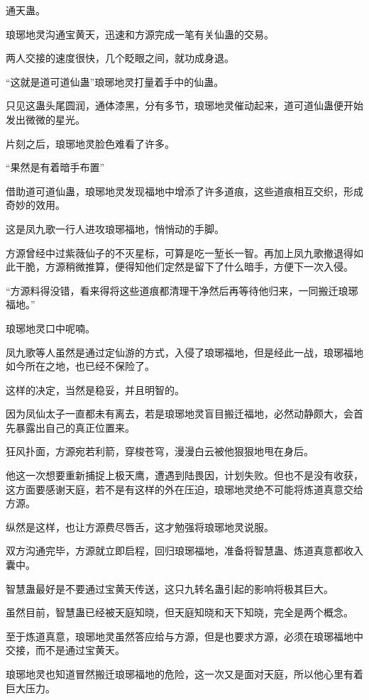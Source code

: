 
\begin{this_body}

通天蛊。

琅琊地灵沟通宝黄天，迅速和方源完成一笔有关仙蛊的交易。

两人交接的速度很快，几个眨眼之间，就功成身退。

“这就是道可道仙蛊”琅琊地灵打量着手中的仙蛊。

只见这蛊头尾圆润，通体漆黑，分有多节，琅琊地灵催动起来，道可道仙蛊便开始发出微微的星光。

片刻之后，琅琊地灵脸色难看了许多。

“果然是有着暗手布置”

借助道可道仙蛊，琅琊地灵发现福地中增添了许多道痕，这些道痕相互交织，形成奇妙的效用。

这是凤九歌一行人进攻琅琊福地，悄悄动的手脚。

方源曾经中过紫薇仙子的不灭星标，可算是吃一堑长一智。再加上凤九歌撤退得如此干脆，方源稍微推算，便得知他们定然是留下了什么暗手，方便下一次入侵。

“方源料得没错，看来得将这些道痕都清理干净然后再等待他归来，一同搬迁琅琊福地。”

琅琊地灵口中呢喃。

凤九歌等人虽然是通过定仙游的方式，入侵了琅琊福地，但是经此一战，琅琊福地如今所在之地，也已经不保险了。

这样的决定，当然是稳妥，并且明智的。

因为凤仙太子一直都未有离去，若是琅琊地灵盲目搬迁福地，必然动静颇大，会首先暴露出自己的真正位置来。

狂风扑面，方源宛若利箭，穿梭苍穹，漫漫白云被他狠狠地甩在身后。

他这一次想要重新捕捉上极天鹰，遭遇到陆畏因，计划失败。但也不是没有收获，这方面要感谢天庭，若不是有这样的外在压迫，琅琊地灵绝不可能将炼道真意交给方源。

纵然是这样，也让方源费尽唇舌，这才勉强将琅琊地灵说服。

双方沟通完毕，方源就立即启程，回归琅琊福地，准备将智慧蛊、炼道真意都收入囊中。

智慧蛊最好是不要通过宝黄天传送，这只九转名蛊引起的影响将极其巨大。

虽然目前，智慧蛊已经被天庭知晓，但天庭知晓和天下知晓，完全是两个概念。

至于炼道真意，琅琊地灵虽然答应给与方源，但是也要求方源，必须在琅琊福地中交接，而不是通过宝黄天。

琅琊地灵也知道冒然搬迁琅琊福地的危险，这一次又是面对天庭，所以他心里有着巨大压力。


\end{this_body}
